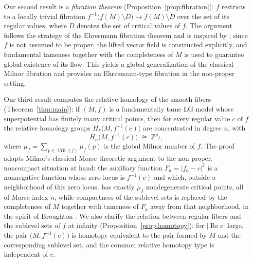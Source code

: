 \documentclass[11pt]{amsart}
\theoremstyle{plain}
\theoremstyle{definition}
\theoremstyle{remark}
\numberwithin{equation}{section}
\begin{document}
Our second result is a \emph{fibration theorem} (Proposition~\ref{prop:fibration}): $f$ restricts to a locally trivial fibration $f^{-1}\bigl(f(M)\setminus D\bigr)\to f(M)\setminus D$ over the set of its regular values, where $D$ denotes the set of critical values of $f$.
The argument follows the strategy of the Ehresmann fibration theorem and is inspired by \cite[Lemma 4.3]{Broughton1988}; since $f$ is not assumed to be proper, the lifted vector field is constructed explicitly, and fundamental tameness together with the completeness of $M$ is used to guarantee global existence of its flow.
This yields a global generalization of the classical Milnor fibration and provides an Ehresmann-type fibration in the non-proper setting.

Our third result computes the relative homology of the smooth fibers (Theorem~\ref{thm:main}): if $(M,f)$ is a fundamentally tame LG model whose superpotential has finitely many critical points, then for every regular value $c$ of $f$ the relative homology groups $H_*\bigl(M,f^{-1}(c)\bigr)$ are concentrated in degree $n$, with
\begin{equation*}
    H_n\bigl(M,f^{-1}(c)\bigr)\;\cong\;\mathbb{Z}^{\mu_f},
\end{equation*}
where $\mu_f=\sum_{p\in\operatorname{Crit}(f)}\mu_f(p)$ is the global Milnor number of $f$.
The proof adapts Milnor's classical Morse-theoretic argument \cite{milnor1963morse} to the non-proper, noncompact situation at hand: the auxiliary function $F_a=|f_a-c|^2$ is a nonnegative function whose zero locus is $f^{-1}(c)$ and which, outside a neighborhood of this zero locus, has exactly $\mu_f$ nondegenerate critical points, all of Morse index $n$, while compactness of the sublevel sets is replaced by the completeness of $M$ together with tameness of $F_a$ away from that neighborhood, in the spirit of Broughton \cite{Broughton1988}.
We also clarify the relation between regular fibers and the sublevel sets of $f$ at infinity (Proposition~\ref{prop:homotopy}): for $|\operatorname{Re} c|$ large, the pair $\bigl(M,f^{-1}(c)\bigr)$ is homotopy equivalent to the pair formed by $M$ and the corresponding sublevel set, and the common relative homotopy type is independent of $c$.
\end{document}
